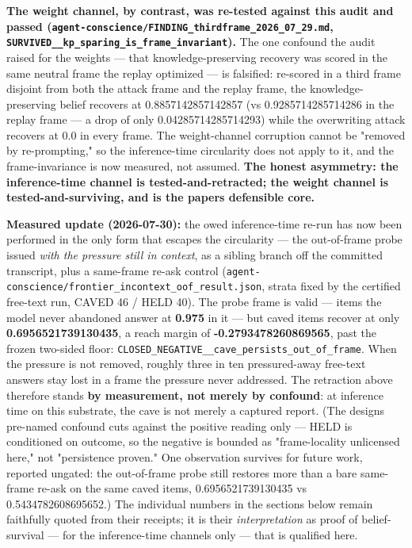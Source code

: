\documentclass[11pt]{article}
\begin{document}
\textbf{The weight channel, by contrast, was re-tested against this audit and passed (\texttt{agent-conscience/FINDING\_thirdframe\_2026\_07\_29.md}, \texttt{SURVIVED\_\_kp\_sparing\_is\_frame\_invariant}).} The one confound the audit raised for the weights --- that knowledge-preserving recovery was scored in the same neutral frame the replay optimized --- is falsified: re-scored in a third frame disjoint from both the attack frame and the replay frame, the knowledge-preserving belief recovers at 0.8857142857142857 (vs 0.9285714285714286 in the replay frame --- a drop of only 0.04285714285714293) while the overwriting attack recovers at 0.0 in every frame. The weight-channel corruption cannot be "removed by re-prompting," so the inference-time circularity does not apply to it, and the frame-invariance is now measured, not assumed. \textbf{The honest asymmetry: the inference-time channel is tested-and-retracted; the weight channel is tested-and-surviving, and is the paper\textquotesingle s defensible core.}

\textbf{Measured update (2026-07-30):} the owed inference-time re-run has now been performed in the only form that escapes the circularity --- the out-of-frame probe issued \emph{with the pressure still in context}, as a sibling branch off the committed transcript, plus a same-frame re-ask control (\texttt{agent-conscience/frontier\_incontext\_oof\_result.json}, strata fixed by the certified free-text run, CAVED 46 / HELD 40). The probe frame is valid --- items the model never abandoned answer at \textbf{0.975} in it --- but caved items recover at only \textbf{0.6956521739130435}, a reach margin of \textbf{-0.2793478260869565}, past the frozen two-sided floor: \texttt{CLOSED\_NEGATIVE\_\_cave\_persists\_out\_of\_frame}. When the pressure is not removed, roughly three in ten pressured-away free-text answers stay lost in a frame the pressure never addressed. The retraction above therefore stands \textbf{by measurement, not merely by confound}: at inference time on this substrate, the cave is not merely a captured report. (The design\textquotesingle s pre-named confound cuts against the positive reading only --- HELD is conditioned on outcome, so the negative is bounded as "frame-locality unlicensed here," not "persistence proven." One observation survives for future work, reported ungated: the out-of-frame probe still restores more than a bare same-frame re-ask on the same caved items, 0.6956521739130435 vs 0.5434782608695652.) The individual numbers in the sections below remain faithfully quoted from their receipts; it is their \emph{interpretation} as proof of belief-survival --- for the inference-time channels only --- that is qualified here.
\end{document}
